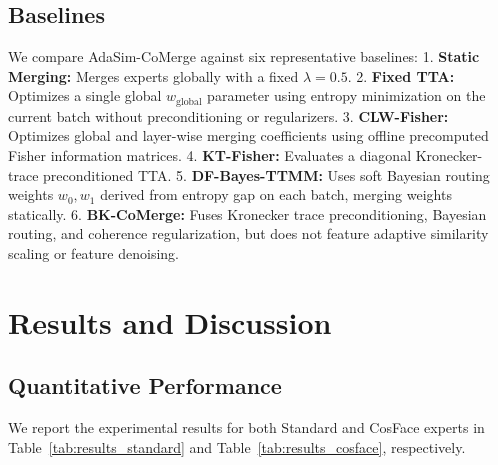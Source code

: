 \documentclass{article}
\theoremstyle{plain}
\theoremstyle{definition}
\theoremstyle{remark}
\begin{document}
\subsection{Baselines}
We compare AdaSim-CoMerge against six representative baselines:
1. \textbf{Static Merging:} Merges experts globally with a fixed $\lambda = 0.5$.
2. \textbf{Fixed TTA:} Optimizes a single global $w_{\text{global}}$ parameter using entropy minimization on the current batch without preconditioning or regularizers.
3. \textbf{CLW-Fisher:} Optimizes global and layer-wise merging coefficients using offline precomputed Fisher information matrices.
4. \textbf{KT-Fisher:} Evaluates a diagonal Kronecker-trace preconditioned TTA.
5. \textbf{DF-Bayes-TTMM:} Uses soft Bayesian routing weights $w_0, w_1$ derived from entropy gap on each batch, merging weights statically.
6. \textbf{BK-CoMerge:} Fuses Kronecker trace preconditioning, Bayesian routing, and coherence regularization, but does not feature adaptive similarity scaling or feature denoising.

\section{Results and Discussion}
\label{sec:results}

\subsection{Quantitative Performance}
We report the experimental results for both Standard and CosFace experts in Table~\ref{tab:results_standard} and Table~\ref{tab:results_cosface}, respectively. 

\begin{table}[t]
\centering
\caption{Test-Time Model Merging accuracy (\%) across non-stationary stream segments using Standard experts.}
\label{tab:results_standard}
\end{table}
\end{document}

